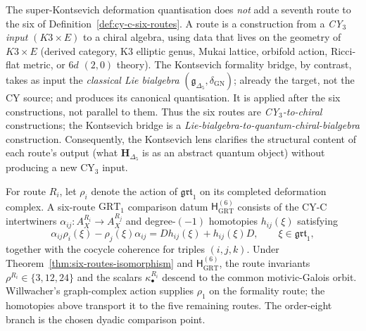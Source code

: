 \begin{remark}
\label{rem:cy-c-six-routes-kontsevich-not-seventh}
The super-Kontsevich deformation quantisation does \emph{not} add a
seventh route to the six of Definition~\ref{def:cy-c-six-routes}. A
route is a construction from a \emph{CY$_3$ input} $(K3 \times E)$ to
a chiral algebra, using data that lives on the geometry of $K3\times E$
(derived category, K3 elliptic genus, Mukai lattice, orbifold action,
Ricci-flat metric, or $6d$ $(2,0)$ theory). The Kontsevich formality
bridge, by contrast, takes as input the \emph{classical Lie bialgebra}
$(\mathfrak{g}_{\Delta_5}, \delta_{\mathrm{GN}})$; already the
target, not the CY source; and produces its canonical
quantisation. It is applied after the six constructions, not
parallel to them. Thus the six routes are
\emph{CY$_3$-to-chiral} constructions; the Kontsevich bridge is a
\emph{Lie-bialgebra-to-quantum-chiral-bialgebra} construction.
Consequently, the Kontsevich lens clarifies the structural content
of each route's output (what $\mathbf{H}_{\Delta_5}$ is as an abstract
quantum object) without producing a new CY$_3$ input.
\end{remark}

\begin{remark}
\label{rem:cy-c-six-routes-grt1-equivariance}
For route $R_i$, let $\rho_i$ denote the action of
$\mathfrak{grt}_1$ on its completed deformation complex.  A six-route
$\mathrm{GRT}_1$ comparison datum $\mathsf H_{\mathrm{GRT}}^{(6)}$
consists of the CY-C intertwiners
$\alpha_{ij}:A_X^{R_i}\to A_X^{R_j}$ and degree-$(-1)$ homotopies
$h_{ij}(\xi)$ satisfying
\[
 \alpha_{ij}\rho_i(\xi)-\rho_j(\xi)\alpha_{ij}
 =D h_{ij}(\xi)+h_{ij}(\xi)D,
 \qquad \xi\in\mathfrak{grt}_1,
\]
together with the cocycle coherence for triples $(i,j,k)$.  Under
Theorem~\ref{thm:six-routes-isomorphism} and
$\mathsf H_{\mathrm{GRT}}^{(6)}$, the route invariants
$\rho^{R_i}\in\{3,12,24\}$ and the scalars
$\kappa_\bullet^{R_i}$ descend to the common motivic-Galois orbit.
Willwacher's graph-complex action supplies $\rho_1$ on the formality
route; the homotopies above transport it to the five remaining
routes.  The order-eight branch is the chosen dyadic comparison
point.
\end{remark}

